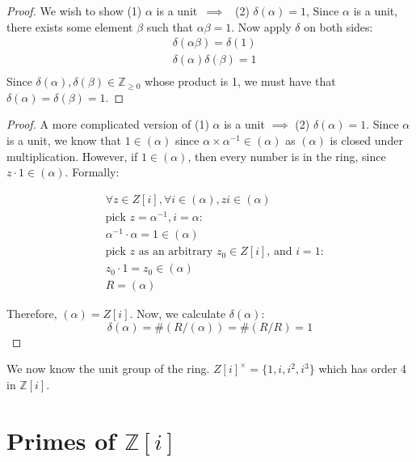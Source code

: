 \documentclass{book}
\newcommand{\Z}{\ensuremath{\mathbb{Z}}}
\theoremstyle{definition}
\begin{document}
\begin{proof}
We wish to show (1) $\alpha$ is a unit~$\implies$~ (2) $\delta (\alpha) = 1$, 
Since $\alpha$ is a unit, there exists some element $\beta$ such that $\alpha \beta = 1$.
Now apply $\delta$ on both sides:
\begin{align*}
&\delta(\alpha \beta) = \delta(1) \\
&\delta(\alpha) \delta(\beta) = 1 \\
\end{align*}
Since $\delta(\alpha), \delta(\beta) \in \Z_{\geq 0}$ whose product is 1, we must have that
$\delta(\alpha) = \delta(\beta) = 1$. 
\end{proof}


\begin{proof}
A more complicated version of (1) $\alpha$ is a unit $\implies$ (2) $\delta (\alpha) = 1$.
Since $\alpha$ is a unit, we know that $1 \in (\alpha)$ since $\alpha \times \alpha^{-1} \in (\alpha)$
as $(\alpha)$ is closed under multiplication. However, if $1 \in (\alpha)$,
then every number is in the ring, since $z \cdot 1 \in (\alpha)$. Formally:

\begin{align*}
&\forall z \in Z[i], \forall i \in (\alpha), zi \in (\alpha) \\
&\text{pick $z = \alpha^{-1}, i = \alpha$:} \\
&\alpha^{-1} \cdot \alpha = 1 \in (\alpha) \\
&\text{pick $z$ as an arbitrary $z_0 \in Z[i]$, and $i = 1$:} \\
&z_0 \cdot 1 =  z_0 \in (\alpha) \\
&R = (\alpha)
\end{align*}

Therefore, $(\alpha) = Z[i]$. Now, we calculate $\delta(\alpha)$:
$$\delta(\alpha) = \#(R/(\alpha)) = \#(R/R) = 1$$
\end{proof}

We now know the unit group of the ring. $Z[i]^\times = \{ 1, i, i^2, i^3 \}$
which has order 4 in $\Z[i]$.

\section{Primes of $\Z[i]$}
\end{document}
